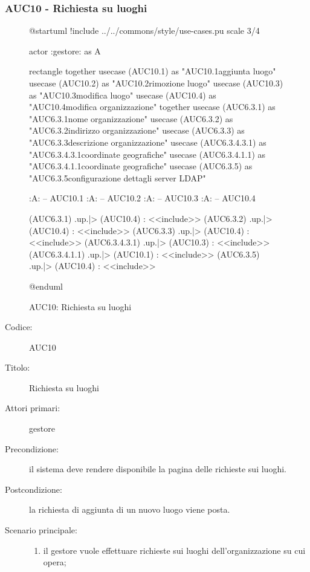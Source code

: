 \documentclass[casi-duso]{subfiles}
\begin{document}
\subsubsection{AUC10 - Richiesta su luoghi}%
\label{subsub:AUC10}

\begin{figure}[h!]
  \centering
  \begin{plantuml}
  @startuml
  !include ../../commons/style/use-cases.pu
  scale 3/4

  actor :gestore: as A

  rectangle {
    together {
      usecase (AUC10.1) as "AUC10.1\nRichiesta aggiunta luogo"
      usecase (AUC10.2) as "AUC10.2\nRichiesta rimozione luogo"
      usecase (AUC10.3) as "AUC10.3\nRichiesta modifica luogo"
      usecase (AUC10.4) as "AUC10.4\nRichiesta modifica organizzazione"
    }
    together {
      usecase (AUC6.3.1) as "AUC6.3.1\nModifica nome organizzazione"
      usecase (AUC6.3.2) as "AUC6.3.2\nModifica indirizzo organizzazione"
      usecase (AUC6.3.3) as "AUC6.3.3\nModifica descrizione organizzazione"
      usecase (AUC6.3.4.3.1) as "AUC6.3.4.3.1\nModifica coordinate geografiche"
      usecase (AUC6.3.4.1.1) as "AUC6.3.4.1.1\nInserisci coordinate geografiche"
      usecase (AUC6.3.5) as "AUC6.3.5\nModifica configurazione dettagli server LDAP"
    }
  }

  :A: -- AUC10.1
  :A: -- AUC10.2
  :A: -- AUC10.3
  :A: -- AUC10.4


  (AUC6.3.1) .up.|> (AUC10.4) : <<include>>
  (AUC6.3.2) .up.|> (AUC10.4) : <<include>>
  (AUC6.3.3) .up.|> (AUC10.4) : <<include>>
  (AUC6.3.4.3.1) .up.|> (AUC10.3) : <<include>>
  (AUC6.3.4.1.1) .up.|> (AUC10.1) : <<include>>
  (AUC6.3.5) .up.|> (AUC10.4) : <<include>>

  @enduml
  \end{plantuml}
  \caption{AUC10: Richiesta su luoghi}
  \label{fig:auc10}
\end{figure}

\begin{description}
  \item[Codice:] AUC10
  \item[Titolo:] Richiesta su luoghi
  \item[Attori primari:] gestore
  \item[Precondizione:] il sistema deve rendere disponibile la pagina delle richieste sui luoghi.
  \item[Postcondizione:] la richiesta di aggiunta di un nuovo luogo viene posta.
  \item[Scenario principale:]
  \begin{enumerate}
    \item il gestore vuole effettuare richieste sui luoghi dell'organizzazione su cui opera;
  \end{enumerate}
\end{description}
\end{document}
